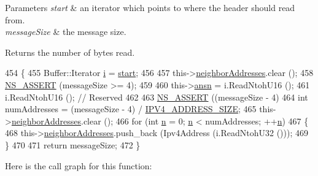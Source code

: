 \begin{DoxyParams}{Parameters}
{\em start} & an iterator which points to where the header should read from. \\
\hline
{\em message\+Size} & the message size. \\
\hline
\end{DoxyParams}
\begin{DoxyReturn}{Returns}
the number of bytes read. 
\end{DoxyReturn}

\begin{DoxyCode}
454 \{
455   Buffer::Iterator \hyperlink{bernuolliDistribution_8m_a6f6ccfcf58b31cb6412107d9d5281426}{i} = \hyperlink{namespacevisualizer_1_1core_a2a35e5d8a34af358b508dac8635754e0}{start};
456 
457   this->\hyperlink{structns3_1_1olsr_1_1MessageHeader_1_1Tc_a236424f611929db7d7f154f8c31c970e}{neighborAddresses}.clear ();
458   \hyperlink{assert_8h_a6dccdb0de9b252f60088ce281c49d052}{NS\_ASSERT} (messageSize >= 4);
459 
460   this->\hyperlink{structns3_1_1olsr_1_1MessageHeader_1_1Tc_a0f74e45f855b1b500fb950336ef4aa63}{ansn} = i.ReadNtohU16 ();
461   i.ReadNtohU16 (); \textcolor{comment}{// Reserved}
462 
463   \hyperlink{assert_8h_a6dccdb0de9b252f60088ce281c49d052}{NS\_ASSERT} ((messageSize - 4) %
464   \textcolor{keywordtype}{int} numAddresses = (messageSize - 4) / \hyperlink{olsr-header_8cc_a78eabd4fb6c036f7de9b598066b3c39e}{IPV4\_ADDRESS\_SIZE};
465   this->\hyperlink{structns3_1_1olsr_1_1MessageHeader_1_1Tc_a236424f611929db7d7f154f8c31c970e}{neighborAddresses}.clear ();
466   \textcolor{keywordflow}{for} (\textcolor{keywordtype}{int} \hyperlink{namespacesample-rng-plot_aeb5ee5c431e338ef39b7ac5431242e1d}{n} = 0; \hyperlink{namespacesample-rng-plot_aeb5ee5c431e338ef39b7ac5431242e1d}{n} < numAddresses; ++\hyperlink{namespacesample-rng-plot_aeb5ee5c431e338ef39b7ac5431242e1d}{n})
467     \{
468       this->\hyperlink{structns3_1_1olsr_1_1MessageHeader_1_1Tc_a236424f611929db7d7f154f8c31c970e}{neighborAddresses}.push\_back (Ipv4Address (i.ReadNtohU32 ()));
469     \}
470 
471   \textcolor{keywordflow}{return} messageSize;
472 \}
\end{DoxyCode}


Here is the call graph for this function\+:


